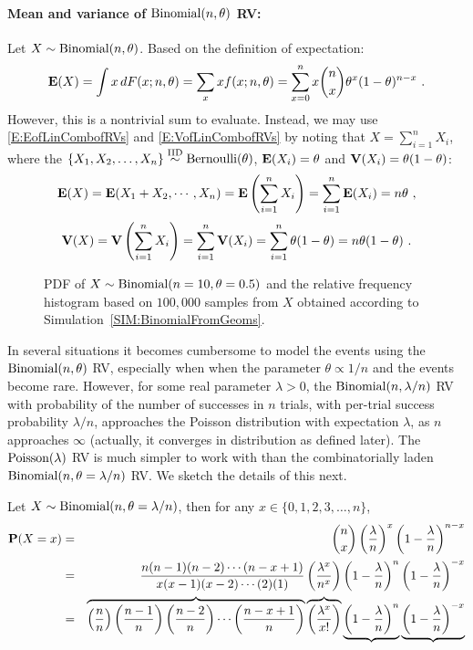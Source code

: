 \paragraph{Mean and variance of $\mbox{{\rm Binomial}}(n,\theta)$ RV:}
Let $X \sim \mbox{{\rm Binomial}}(n,\theta)$.  Based on the definition of expectation:
\[
\e(X) = \int x \, dF(x; n,\theta) = \sum_x x f(x;n,\theta) = \sum_{x =0}^n x \binom{n}{x} \theta^x (1-\theta)^{n-x} \ .
\]
However, this is a nontrivial sum to evaluate.  Instead, we may use \eqref{E:EofLinCombofRVs} and \eqref{E:VofLinCombofRVs} by noting that $X = \sum_{i=1}^n X_i$, where the $\{X_1,X_2,\ldots,X_n \} \overset{{\rm IID}}{\sim} \mbox{{\rm Bernoulli}}(\theta)$, $\mathbf{E}(X_i) = \theta$ and $\mathbf{V}(X_i)=\theta(1-\theta)$:
\[
\mathbf{E}(X) = \mathbf{E}(X_1+X_2, \cdots ,X_n) = \mathbf{E} \left( \sum_{i=1}^n X_i \right) = \sum_{i=1}^n \mathbf{E}(X_i) = n \theta \ ,
\]
\[
\mathbf{V}(X) = \mathbf{V} \left( \sum_{i=1}^n X_i \right) = \sum_{i=1}^n \mathbf{V}(X_i) = \sum_{i=1}^n{\theta(1-\theta)} = n\theta(1-\theta) \ .
\]

\begin{figure}[htpb]
\caption{PDF of $X \sim \mbox{{\rm Binomial}}(n=10,\theta=0.5)$ and the relative frequency histogram based on $100,000$ samples from $X$ obtained according to Simulation~\ref{SIM:BinomialFromGeoms}.\label{F:PlotPdfSim10000HistBinomByGeomsn10thetaHalf}} %
\centering   {}
\end{figure}


In several situations it becomes cumbersome to model the events using the $\mbox{{\rm Binomial}}(n,\theta)$ RV, especially when when the parameter $\theta \propto 1/n$ and the events become rare.  However, for some real parameter $\lambda>0$, the $\mbox{{\rm Binomial}}(n,\lambda/n)$ RV with probability of the number of successes in $n$ trials, with per-trial success probability $\lambda/n$, approaches the Poisson distribution with expectation $\lambda$, as $n$ approaches $\infty$ (actually, it converges in distribution as defined later).  The $\mbox{{\rm Poisson}}(\lambda)$ RV is much simpler to work with than the combinatorially laden $\mbox{{\rm Binomial}}(n,\theta=\lambda/n)$ RV.  We sketch the details of this next.

Let $X \sim \mbox{{\rm Binomial}}(n,\theta=\lambda/n)$, then for any $x \in \{0,1,2,3,\ldots,n\}$,
\begin{eqnarray}
\mathbf{P}(X=x)
&=&
\binom{n}{x} \left( \frac{\lambda}{n} \right)^x \left( 1- \frac{\lambda}{n} \right)^{n-x} \notag \\
&=& \frac{n(n-1)(n-2)\cdots(n-x+1)}{x(x-1)(x-2)\cdots (2)(1)}
\left( \frac{\lambda^x}{n^x} \right)
\left( 1- \frac{\lambda}{n} \right)^n
\left( 1- \frac{\lambda}{n} \right)^{-x} \notag \\
&=&
\overbrace{\left( \frac{n}{n} \right) \left( \frac{n-1}{n} \right) \left( \frac{n-2}{n} \right) \cdots \left( \frac{n-x+1}{n} \right)}
\overbrace{\left( \frac{\lambda^x}{x!} \right)}
\underbrace{\left( 1- \frac{\lambda}{n} \right)^n}
\underbrace{\left( 1- \frac{\lambda}{n} \right)^{-x}}  \notag \\
\end{eqnarray}

